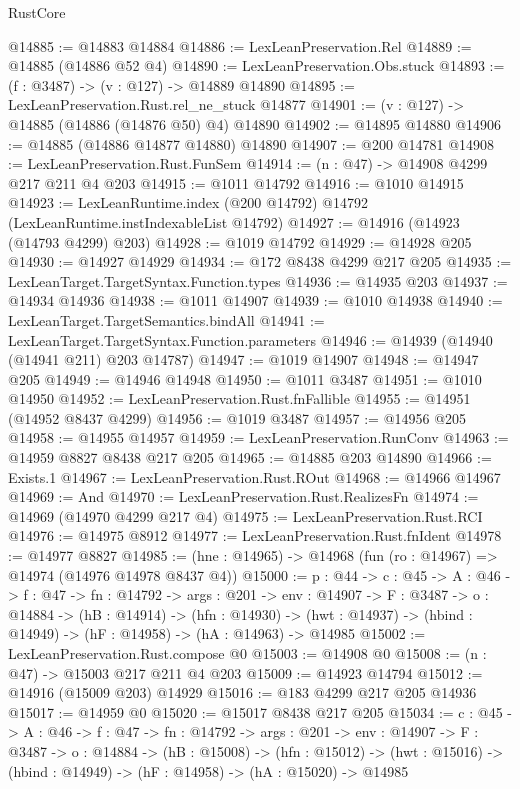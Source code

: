 \begin{lexlean}{RustCore}
\begin{coremodule}
@14885 := @14883 @14884
@14886 := LexLeanPreservation.Rel
@14889 := @14885 (@14886 @52 @4)
@14890 := LexLeanPreservation.Obs.stuck
@14893 := (f : @3487) -> (v : @127) -> @14889 @14890
@14895 := LexLeanPreservation.Rust.rel_ne_stuck @14877
@14901 := (v : @127) -> @14885 (@14886 (@14876 @50) @4) @14890
@14902 := @14895 @14880
@14906 := @14885 (@14886 @14877 @14880) @14890
@14907 := @200 @14781
@14908 := LexLeanPreservation.Rust.FunSem
@14914 := (n : @47) -> @14908 @4299 @217 @211 @4 @203
@14915 := @1011 @14792
@14916 := @1010 @14915
@14923 := LexLeanRuntime.index (@200 @14792) @14792 (LexLeanRuntime.instIndexableList @14792)
@14927 := @14916 (@14923 (@14793 @4299) @203)
@14928 := @1019 @14792
@14929 := @14928 @205
@14930 := @14927 @14929
@14934 := @172 @8438 @4299 @217 @205
@14935 := LexLeanTarget.TargetSyntax.Function.types
@14936 := @14935 @203
@14937 := @14934 @14936
@14938 := @1011 @14907
@14939 := @1010 @14938
@14940 := LexLeanTarget.TargetSemantics.bindAll
@14941 := LexLeanTarget.TargetSyntax.Function.parameters
@14946 := @14939 (@14940 (@14941 @211) @203 @14787)
@14947 := @1019 @14907
@14948 := @14947 @205
@14949 := @14946 @14948
@14950 := @1011 @3487
@14951 := @1010 @14950
@14952 := LexLeanPreservation.Rust.fnFallible
@14955 := @14951 (@14952 @8437 @4299)
@14956 := @1019 @3487
@14957 := @14956 @205
@14958 := @14955 @14957
@14959 := LexLeanPreservation.RunConv
@14963 := @14959 @8827 @8438 @217 @205
@14965 := @14885 @203 @14890
@14966 := Exists.{1}
@14967 := LexLeanPreservation.Rust.ROut
@14968 := @14966 @14967
@14969 := And
@14970 := LexLeanPreservation.Rust.RealizesFn
@14974 := @14969 (@14970 @4299 @217 @4)
@14975 := LexLeanPreservation.Rust.RCI
@14976 := @14975 @8912
@14977 := LexLeanPreservation.Rust.fnIdent
@14978 := @14977 @8827
@14985 := (hne : @14965) -> @14968 (fun (ro : @14967) => @14974 (@14976 @14978 @8437 @4))
@15000 := {p : @44} ->
  {c : @45} ->
  {A : @46} ->
  {f : @47} ->
  {fn : @14792} ->
  {args : @201} ->
  {env : @14907} ->
  {F : @3487} ->
  {o : @14884} ->
  (hB : @14914) ->
  (hfn : @14930) -> (hwt : @14937) -> (hbind : @14949) -> (hF : @14958) -> (hA : @14963) -> @14985
@15002 := LexLeanPreservation.Rust.compose @0
@15003 := @14908 @0
@15008 := (n : @47) -> @15003 @217 @211 @4 @203
@15009 := @14923 @14794
@15012 := @14916 (@15009 @203) @14929
@15016 := @183 @4299 @217 @205 @14936
@15017 := @14959 @0
@15020 := @15017 @8438 @217 @205
@15034 := {c : @45} ->
  {A : @46} ->
  {f : @47} ->
  {fn : @14792} ->
  {args : @201} ->
  {env : @14907} ->
  {F : @3487} ->
  {o : @14884} ->
  (hB : @15008) ->
  (hfn : @15012) -> (hwt : @15016) -> (hbind : @14949) -> (hF : @14958) -> (hA : @15020) -> @14985

\end{coremodule}
\end{lexlean}
